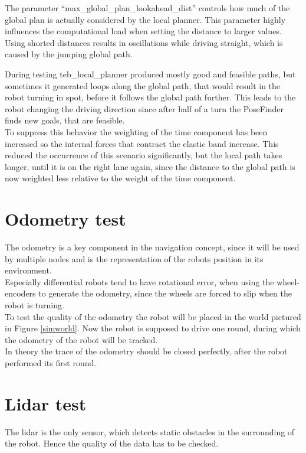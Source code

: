 The parameter ``max\_global\_plan\_lookahead\_dist'' controls how much of the global plan is actually considered by the local planner. This parameter highly influences the computational load when setting the distance to larger values. Using shorted distances results in oscillations while driving straight, which is caused by the jumping global path.

During testing teb\_local\_planner produced mostly good and feasible paths, but sometimes it generated loops along the global path, that would result in the robot turning in spot, before it follows the global path further. This leads to the robot changing the driving direction since after half of a turn the PoseFinder finds new goals, that are feasible.\\

To suppress this behavior the weighting of the time component has been increased so the internal forces that contract the elastic band increase. This reduced the occurrence of this scenario significantly, but the local path takes longer, until it is on the right lane again, since the distance to the global path is now weighted less relative to the weight of the time component.

\section{Odometry test}
The odometry is a key component in the navigation concept, since it will be used by multiple nodes and is the representation of the robots position in its environment.\\

Especially differential robots tend to have rotational error, when using the wheel-encoders to generate the odometry, since the wheels are forced to slip when the robot is turning.\\

To test the quality of the odometry the robot will be placed in the world pictured in Figure \ref{simworld}. Now the robot is supposed to drive one round, during which the odometry of the robot will be tracked.\\

In theory the trace of the odometry should be closed perfectly, after the robot performed its first round.\\

\section{Lidar test}
The lidar is the only sensor, which detects static obstacles in the surrounding of the robot. Hence the quality of the data has to be checked.

